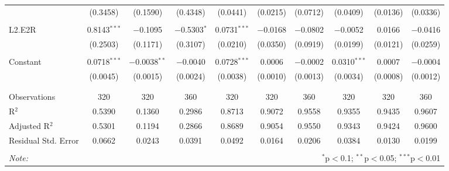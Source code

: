 \begin{table}[!htbp]
\begin{tabular}{@{\extracolsep{5pt}}lccccccccc}
  & (0.3458) & (0.1590) & (0.4348) & (0.0441) & (0.0215) & (0.0712) & (0.0409) & (0.0136) & (0.0336) \\ 
  & & & & & & & & & \\ 
 L2.E2R & 0.8143$^{***}$ & $-$0.1095 & $-$0.5303$^{*}$ & 0.0731$^{***}$ & $-$0.0168 & $-$0.0802 & $-$0.0052 & 0.0166 & $-$0.0416 \\ 
  & (0.2503) & (0.1171) & (0.3107) & (0.0210) & (0.0350) & (0.0919) & (0.0199) & (0.0121) & (0.0259) \\ 
  & & & & & & & & & \\ 
 Constant & 0.0718$^{***}$ & $-$0.0038$^{**}$ & $-$0.0040 & 0.0728$^{***}$ & 0.0006 & $-$0.0002 & 0.0310$^{***}$ & 0.0007 & $-$0.0004 \\ 
  & (0.0045) & (0.0015) & (0.0024) & (0.0038) & (0.0010) & (0.0013) & (0.0034) & (0.0008) & (0.0012) \\ 
  & & & & & & & & & \\ 
\hline \\[-1.8ex] 
Observations & 320 & 320 & 360 & 320 & 320 & 360 & 320 & 320 & 360 \\ 
R$^{2}$ & 0.5390 & 0.1360 & 0.2986 & 0.8713 & 0.9072 & 0.9558 & 0.9355 & 0.9435 & 0.9607 \\ 
Adjusted R$^{2}$ & 0.5301 & 0.1194 & 0.2866 & 0.8689 & 0.9054 & 0.9550 & 0.9343 & 0.9424 & 0.9600 \\ 
Residual Std. Error & 0.0662 & 0.0243 & 0.0391 & 0.0492 & 0.0164 & 0.0206 & 0.0384 & 0.0130 & 0.0199 \\ 
\hline 
\hline \\[-1.8ex] 
\textit{Note:}  & \multicolumn{9}{r}{$^{*}$p$<$0.1; $^{**}$p$<$0.05; $^{***}$p$<$0.01} \\ 
\end{tabular} 
\end{table} 
